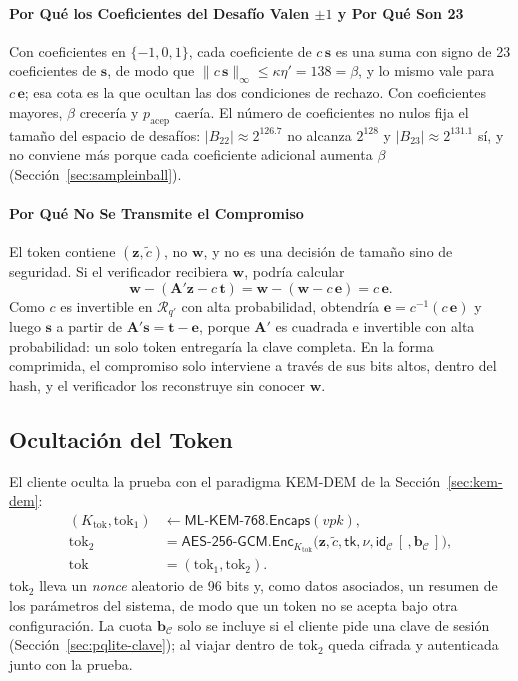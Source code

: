 \paragraph{Por Qué los Coeficientes del Desafío Valen $\pm 1$ y Por Qué Son 23}
Con coeficientes en $\{-1, 0, 1\}$, cada coeficiente de $c\,\mathbf{s}$ es una suma con signo de 23 coeficientes de $\mathbf{s}$, de modo que $\|c\,\mathbf{s}\|_\infty \le \kappa\eta' = 138 = \beta$, y lo mismo vale para $c\,\mathbf{e}$; esa cota es la que ocultan las dos condiciones de rechazo. Con coeficientes mayores, $\beta$ crecería y $p_{\text{acep}}$ caería. El número de coeficientes no nulos fija el tamaño del espacio de desafíos: $|B_{22}| \approx 2^{126.7}$ no alcanza $2^{128}$ y $|B_{23}| \approx 2^{131.1}$ sí, y no conviene más porque cada coeficiente adicional aumenta $\beta$ (Sección~\ref{sec:sampleinball}).

\paragraph{Por Qué No Se Transmite el Compromiso}
\label{sec:pqlite-sin-w}
El token contiene $(\mathbf{z}, \tilde{c})$, no $\mathbf{w}$, y no es una decisión de tamaño sino de seguridad. Si el verificador recibiera $\mathbf{w}$, podría calcular
\begin{equation}
\mathbf{w} - \left(\mathbf{A}'\mathbf{z} - c\,\mathbf{t}\right) = \mathbf{w} - \left(\mathbf{w} - c\,\mathbf{e}\right) = c\,\mathbf{e}.
\end{equation}
Como $c$ es invertible en $\mathcal{R}_{q'}$ con alta probabilidad, obtendría $\mathbf{e} = c^{-1}(c\,\mathbf{e})$ y luego $\mathbf{s}$ a partir de $\mathbf{A}'\mathbf{s} = \mathbf{t} - \mathbf{e}$, porque $\mathbf{A}'$ es cuadrada e invertible con alta probabilidad: un solo token entregaría la clave completa. En la forma comprimida, el compromiso solo interviene a través de sus bits altos, dentro del hash, y el verificador los reconstruye sin conocer $\mathbf{w}$.

\subsection{Ocultación del Token}
\label{sec:pqlite-token}

El cliente oculta la prueba con el paradigma KEM-DEM de la Sección~\ref{sec:kem-dem}:
\begin{align}
(K_{\text{tok}}, \text{tok}_1) &\leftarrow \mathsf{ML\text{-}KEM\text{-}768.Encaps}(vpk), \\
\text{tok}_2 &= \mathsf{AES\text{-}256\text{-}GCM.Enc}_{K_{\text{tok}}}\big(\mathbf{z}, \tilde{c}, \mathsf{tk}, \nu, \mathsf{id}_{\mathcal{C}} \,[\,, \mathbf{b}_{\mathcal{C}}\,]\big), \\
\text{tok} &= (\text{tok}_1, \text{tok}_2).
\end{align}
$\text{tok}_2$ lleva un \textit{nonce} aleatorio de 96 bits y, como datos asociados, un resumen de los parámetros del sistema, de modo que un token no se acepta bajo otra configuración. La cuota $\mathbf{b}_{\mathcal{C}}$ solo se incluye si el cliente pide una clave de sesión (Sección~\ref{sec:pqlite-clave}); al viajar dentro de $\text{tok}_2$ queda cifrada y autenticada junto con la prueba.

